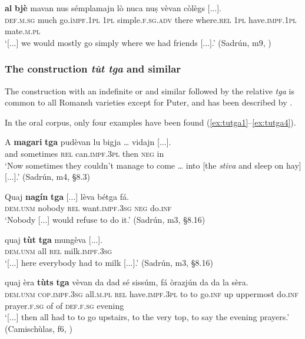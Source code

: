 \ea
\label{ex:albje2}
	\gll [...] \textbf{al} \textbf{bjè} mavan nus sémplamajn lò nuca nuṣ vèvan còlègs [...].\\
{} \textsc{def.m.sg} much go.i\textsc{mpf.1pl} \textsc{1pl} simple.\textsc{f.sg.adv} there where.\textsc{rel} \textsc{1pl} have.\textsc{impf.1pl} mate.\textsc{m.pl}\\
\glt `[...] we would mostly go simply where we had friends [...].' (Sadrún, m9, )
\z

\subsubsection{The construction \textit{tùt tga} and similar}\label{sec:3.2.5.3}
The construction with an indefinite  or  and similar followed by the relative  \textit{tga} is common to all Romansh varieties except for Puter, and has been described by \citet[185--204]{Linder1987}.

In the oral corpus, only four examples have been found (\ref{ex:tutga1}--\ref{ex:tutga4}).

\ea
\label{ex:tutga1}
\gll A  \textbf{magari} \textbf{tga} pudèvan lu bigja … vidajn [...]. \\
and sometimes \textsc{rel} can.\textsc{impf.3pl} then \textsc{neg} {} in\\
\glt `Now sometimes they couldn’t manage to come … into [the \textit{stiva} and sleep on hay] [...].' (Sadrún, m4, §8.3)
\z

\ea
\label{ex:tutga2}
\gll Quaj \textbf{nagín} \textbf{tga} [...] lèva bétga fá.\\
\textsc{dem.unm} nobody \textsc{rel} {}  want.\textsc{impf.3sg} \textsc{neg} do.\textsc{inf}\\
\glt `Nobody [...] would refuse to do it.' (Sadrún, m3, §8.16)
\z

\ea
\label{ex:tutga3}
\gll [...] quaj \textbf{tùt} \textbf{tga} mungèva [...].  \\
{} \textsc{dem.unm} all \textsc{rel} milk.\textsc{impf.3sg}\\
\glt `[...] here everybody had to milk [...].' (Sadrún, m3, §8.16)
\z

\ea
\label{ex:tutga4}
\gll [...] quaj èra \textbf{tùts} \textbf{tga} vèvan da dad  sé sissúm, fá  òrazjún da da la sèra.\\
{} \textsc{dem.unm} \textsc{cop.impf.3sg} all.\textsc{m.pl} \textsc{rel} have.\textsc{impf.3pl} to to go.\textsc{inf} up uppermost do.\textsc{inf} prayer.\textsc{f.sg} of of \textsc{def.f.sg} evening \\
\glt `[...] then all had to to go upstairs, to the very top, to say the evening prayers.' (Camischùlas, f6, )
\z


